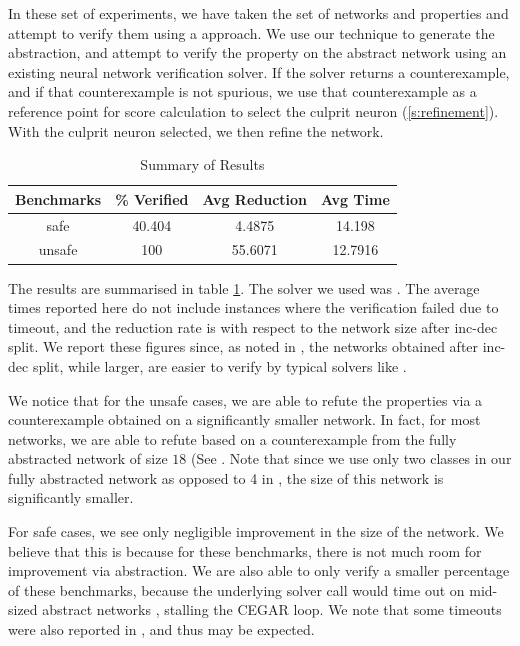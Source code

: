 In these set of experiments, we have taken the \acasxu set of
networks  and
properties and attempt to verify them using a \cegar approach. We use our
technique to generate the abstraction, and attempt to verify the property on the
abstract network using an existing neural network verification solver. If the
solver returns a counterexample, and if that counterexample is not spurious, we
use that counterexample as a reference point for score calculation  to select
the culprit neuron (\ref{s:refinement}). With the culprit neuron selected, we
then refine the network.

\begin{table}
\begin{tabular}{ |c|c|c|c| }
\hline
Benchmarks &    \% Verified &  Avg Reduction &  Avg Time \\
\hline
safe       &        40.404  &         4.4875 &   14.198  \\
unsafe     &       100      &        55.6071 &   12.7916 \\
\hline
\end{tabular}
\caption{Summary of \acasxu Results }
\label{t:acas-summary}
\end{table}

The results are summarised in table \ref{t:acas-summary}. The solver we used was
\abcrown. The average times reported here do not include instances where the
verification failed due to timeout, and the reduction rate is with respect to
the network size after inc-dec split. We report these figures since, as noted in
\cite{cegar-nn}, the networks obtained after inc-dec split, while larger, are
easier to verify by typical solvers like \marabou.

We notice that for the unsafe cases, we are able to refute the
properties via a counterexample obtained on a significantly smaller network. In
fact, for most networks, we are able to refute based on a counterexample from
the fully abstracted network of size $18$ (See . Note that since we use only two classes in our
fully abstracted network as opposed to 4 in \cite{cegar-nn}, the size of this
network is significantly smaller. 

For safe cases, we see only negligible improvement in the size of the network.
We believe that this is because for these benchmarks, there is not much room for
improvement via abstraction. We are also able to only verify a smaller
percentage of these benchmarks, because the underlying solver call would time
out on mid-sized abstract networks , stalling
the CEGAR loop. We note that some timeouts were also reported in
\cite{cegar-nn}, and thus may be expected. 

